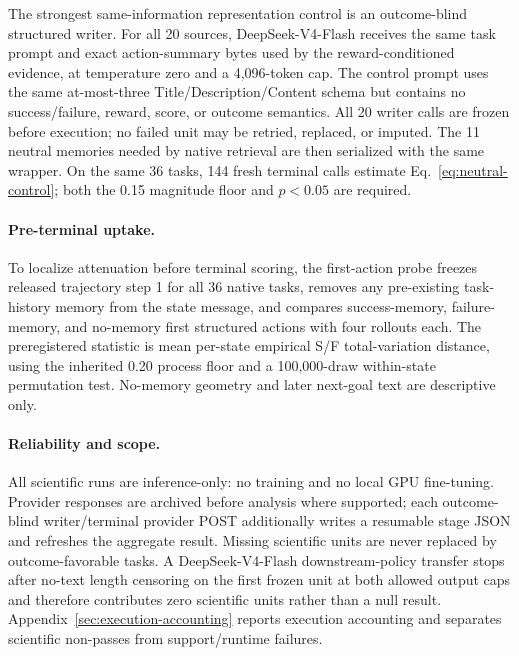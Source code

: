 The strongest same-information representation control is an outcome-blind structured writer. For all 20 sources, DeepSeek-V4-Flash receives the same task prompt and exact action-summary bytes used by the reward-conditioned evidence, at temperature zero and a 4,096-token cap. The control prompt uses the same at-most-three Title/Description/Content schema but contains no success/failure, reward, score, or outcome semantics. All 20 writer calls are frozen before execution; no failed unit may be retried, replaced, or imputed. The 11 neutral memories needed by native retrieval are then serialized with the same wrapper. On the same 36 tasks, 144 fresh terminal calls estimate Eq.~\ref{eq:neutral-control}; both the 0.15 magnitude floor and $p<0.05$ are required.

\paragraph{Pre-terminal uptake.}
To localize attenuation before terminal scoring, the first-action probe freezes released trajectory step 1 for all 36 native tasks, removes any pre-existing task-history memory from the state message, and compares success-memory, failure-memory, and no-memory first structured actions with four rollouts each. The preregistered statistic is mean per-state empirical S/F total-variation distance, using the inherited 0.20 process floor and a 100,000-draw within-state permutation test. No-memory geometry and later next-goal text are descriptive only.

\paragraph{Reliability and scope.}
All scientific runs are inference-only: no training and no local GPU fine-tuning. Provider responses are archived before analysis where supported; each outcome-blind writer/terminal provider POST additionally writes a resumable stage JSON and refreshes the aggregate result. Missing scientific units are never replaced by outcome-favorable tasks. A DeepSeek-V4-Flash downstream-policy transfer stops after no-text length censoring on the first frozen unit at both allowed output caps and therefore contributes zero scientific units rather than a null result. Appendix~\ref{sec:execution-accounting} reports execution accounting and separates scientific non-passes from support/runtime failures.
